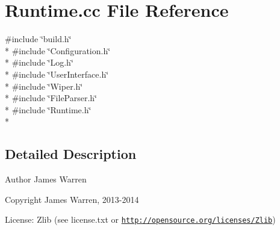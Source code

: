 \section{Runtime.\-cc File Reference}
\label{_runtime_8cc}
{\ttfamily \#include \char`\"{}build.\-h\char`\"{}}\\*
{\ttfamily \#include \char`\"{}Configuration.\-h\char`\"{}}\\*
{\ttfamily \#include \char`\"{}Log.\-h\char`\"{}}\\*
{\ttfamily \#include \char`\"{}User\-Interface.\-h\char`\"{}}\\*
{\ttfamily \#include \char`\"{}Wiper.\-h\char`\"{}}\\*
{\ttfamily \#include \char`\"{}File\-Parser.\-h\char`\"{}}\\*
{\ttfamily \#include \char`\"{}Runtime.\-h\char`\"{}}\\*


\subsection{Detailed Description}
\begin{DoxyAuthor}{Author}
James Warren 
\end{DoxyAuthor}
\begin{DoxyCopyright}{Copyright}
James Warren, 2013-\/2014 
\end{DoxyCopyright}
\begin{DoxyParagraph}{License\-:}
Zlib (see license.\-txt or \href{http://opensource.org/licenses/Zlib}{\tt http\-://opensource.\-org/licenses/\-Zlib}) 
\end{DoxyParagraph}
